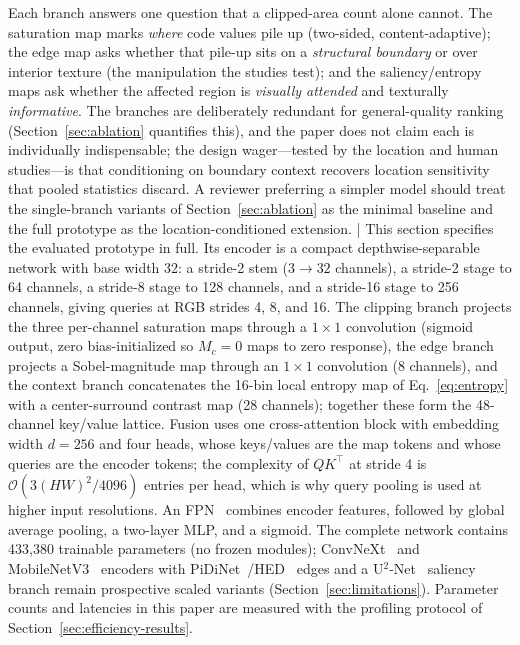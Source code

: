 \documentclass[5p,times,twocolumn]{elsarticle}
\begin{document}
Each branch answers one question that a clipped-area count alone cannot.
The saturation map marks \emph{where} code values pile up (two-sided,
content-adaptive); the edge map asks whether that pile-up sits on a
\emph{structural boundary} or over interior texture (the manipulation the
studies test); and the saliency/entropy maps ask whether the affected
region is \emph{visually attended} and texturally \emph{informative}. The
branches are deliberately redundant for general-quality ranking
(Section~\ref{sec:ablation} quantifies this), and the paper does not claim
each is individually indispensable; the design wager---tested by the
location and human studies---is that conditioning on boundary context
recovers location sensitivity that pooled statistics discard. A reviewer
preferring a simpler model should treat the single-branch variants of
Section~\ref{sec:ablation} as the minimal baseline and the full prototype
as the location-conditioned extension.
|
This section specifies the evaluated prototype in full. Its encoder is a
compact depthwise-separable network with base width 32: a stride-2 stem
($3{\to}32$ channels), a stride-2 stage to 64 channels, a stride-8 stage to
128 channels, and a stride-16 stage to 256 channels, giving queries at RGB
strides 4, 8, and 16. The clipping branch projects the three per-channel
saturation maps through a $1{\times}1$ convolution (sigmoid output, zero
bias-initialized so $M_c = 0$ maps to zero response), the edge branch
projects a Sobel-magnitude map through an $1{\times}1$ convolution (8
channels), and the context branch concatenates the 16-bin local entropy map
of Eq.~\eqref{eq:entropy} with a center-surround contrast map (28 channels);
together these form the 48-channel key/value lattice. Fusion uses one
cross-attention block with embedding width $d = 256$ and four heads, whose
keys/values are the map tokens and whose queries are the encoder tokens; the
complexity of $QK^{\top}$ at stride 4 is
$\mathcal{O}(3(HW)^2/4096)$ entries per head, which is why query pooling is
used at higher input resolutions. An FPN~\cite{lin2017fpn} combines encoder
features, followed by global average pooling, a two-layer MLP, and a sigmoid.
The complete network contains 433{,}380 trainable parameters (no frozen
modules); ConvNeXt~\cite{liu2022convnext} and
MobileNetV3~\cite{howard2019mobilenetv3} encoders with
PiDiNet~\cite{su2021pidinet}/HED~\cite{xie2015hed} edges and a
U$^2$-Net~\cite{qin2020u2net} saliency branch remain prospective scaled
variants (Section~\ref{sec:limitations}). Parameter counts and latencies in
this paper are measured with the profiling protocol of
Section~\ref{sec:efficiency-results}.
\end{document}

